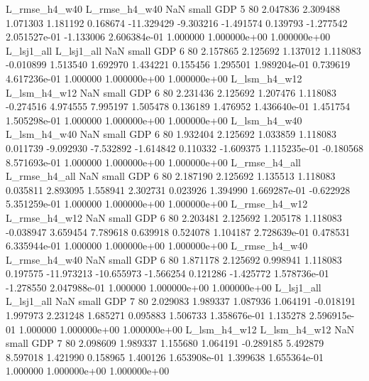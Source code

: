 L_rmse_h4_w40 L_rmse_h4_w40                   NaN      small      GDP                 5 80 2.047836       2.309488 1.071303       1.181192    0.168674    -11.329429     -9.303216    -1.491574       0.139793 -1.277542 2.051527e-01    -1.133006   2.606384e-01            1.000000    1.000000e+00        1.000000e+00
   L_lsj1_all    L_lsj1_all                   NaN      small      GDP                 6 80 2.157865       2.125692 1.137012       1.118083   -0.010899      1.513540      1.692970     1.434221       0.155456  1.295501 1.989204e-01     0.739619   4.617236e-01            1.000000    1.000000e+00        1.000000e+00
 L_lsm_h4_w12  L_lsm_h4_w12                   NaN      small      GDP                 6 80 2.231436       2.125692 1.207476       1.118083   -0.274516      4.974555      7.995197     1.505478       0.136189  1.476952 1.436640e-01     1.451754   1.505298e-01            1.000000    1.000000e+00        1.000000e+00
 L_lsm_h4_w40  L_lsm_h4_w40                   NaN      small      GDP                 6 80 1.932404       2.125692 1.033859       1.118083    0.011739     -9.092930     -7.532892    -1.614842       0.110332 -1.609375 1.115235e-01    -0.180568   8.571693e-01            1.000000    1.000000e+00        1.000000e+00
L_rmse_h4_all L_rmse_h4_all                   NaN      small      GDP                 6 80 2.187190       2.125692 1.135513       1.118083    0.035811      2.893095      1.558941     2.302731       0.023926  1.394990 1.669287e-01    -0.622928   5.351259e-01            1.000000    1.000000e+00        1.000000e+00
L_rmse_h4_w12 L_rmse_h4_w12                   NaN      small      GDP                 6 80 2.203481       2.125692 1.205178       1.118083   -0.038947      3.659454      7.789618     0.639918       0.524078  1.104187 2.728639e-01     0.478531   6.335944e-01            1.000000    1.000000e+00        1.000000e+00
L_rmse_h4_w40 L_rmse_h4_w40                   NaN      small      GDP                 6 80 1.871178       2.125692 0.998941       1.118083    0.197575    -11.973213    -10.655973    -1.566254       0.121286 -1.425772 1.578736e-01    -1.278550   2.047988e-01            1.000000    1.000000e+00        1.000000e+00
   L_lsj1_all    L_lsj1_all                   NaN      small      GDP                 7 80 2.029083       1.989337 1.087936       1.064191   -0.018191      1.997973      2.231248     1.685271       0.095883  1.506733 1.358676e-01     1.135278   2.596915e-01            1.000000    1.000000e+00        1.000000e+00
 L_lsm_h4_w12  L_lsm_h4_w12                   NaN      small      GDP                 7 80 2.098609       1.989337 1.155680       1.064191   -0.289185      5.492879      8.597018     1.421990       0.158965  1.400126 1.653908e-01     1.399638   1.655364e-01            1.000000    1.000000e+00        1.000000e+00
